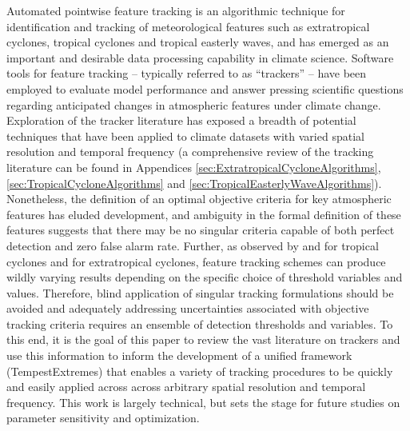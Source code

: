 \documentclass[gmdd, hvmath, online]{copernicus_discussions}
\begin{document}



\introduction  %

Automated pointwise feature tracking is an algorithmic technique for identification and tracking of meteorological features such as extratropical cyclones, tropical cyclones and tropical easterly waves, and has emerged as an important and desirable data processing capability in climate science.  Software tools for feature tracking -- typically referred to as ``trackers'' -- have been employed to evaluate model performance and answer pressing scientific questions regarding anticipated changes in atmospheric features under climate change.  Exploration of the tracker literature has exposed a breadth of potential techniques that have been applied to climate datasets with varied spatial resolution and temporal frequency (a comprehensive review of the tracking literature can be found in Appendices \ref{sec:ExtratropicalCycloneAlgorithms}, \ref{sec:TropicalCycloneAlgorithms} and \ref{sec:TropicalEasterlyWaveAlgorithms}).  Nonetheless, the definition of an optimal objective criteria for key atmospheric features has eluded development, and ambiguity in the formal definition of these features suggests that there may be no singular criteria capable of both perfect detection and zero false alarm rate.  Further, as observed by \cite{walsh2007objectively} and \citet{horn2014tracking} for tropical cyclones and \cite{neu2013imilast} for extratropical cyclones, feature tracking schemes can produce wildly varying results depending on the specific choice of threshold variables and values. Therefore, blind application of singular tracking formulations should be avoided and adequately addressing uncertainties associated with objective tracking criteria requires an ensemble of detection thresholds and variables.  To this end, it is the goal of this paper to review the vast literature on trackers and use this information to inform the development of a unified framework (TempestExtremes) that enables a variety of tracking procedures to be quickly and easily applied across across arbitrary spatial resolution and temporal frequency.  This work is largely technical, but sets the stage for future studies on parameter sensitivity and optimization.
\end{document}
